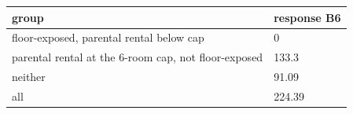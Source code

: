 \begingroup\small
\setlength{\tabcolsep}{3pt}
\renewcommand{\arraystretch}{1.04}
\begin{tabularx}{\linewidth}{XX}
\toprule
group & response B6 \\
\midrule
floor-exposed, parental rental below cap & 0 \\
parental rental at the 6-room cap, not floor-exposed & 133.3 \\
neither & 91.09 \\
all & 224.39 \\
\bottomrule
\end{tabularx}
\endgroup
